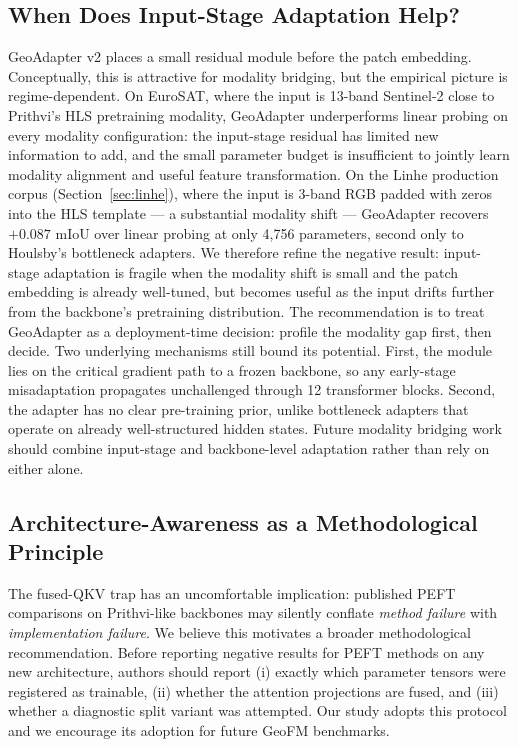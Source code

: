 \subsection{When Does Input-Stage Adaptation Help?}
GeoAdapter v2 places a small residual module before the patch embedding. Conceptually, this is attractive for modality bridging, but the empirical picture is regime-dependent. On EuroSAT, where the input is 13-band Sentinel-2 close to Prithvi's HLS pretraining modality, GeoAdapter underperforms linear probing on every modality configuration: the input-stage residual has limited new information to add, and the small parameter budget is insufficient to jointly learn modality alignment and useful feature transformation. On the Linhe production corpus (Section~\ref{sec:linhe}), where the input is 3-band RGB padded with zeros into the HLS template --- a substantial modality shift --- GeoAdapter recovers $+0.087$ mIoU over linear probing at only 4{,}756 parameters, second only to Houlsby's bottleneck adapters. We therefore refine the negative result: input-stage adaptation is fragile when the modality shift is small and the patch embedding is already well-tuned, but becomes useful as the input drifts further from the backbone's pretraining distribution. The recommendation is to treat GeoAdapter as a deployment-time decision: profile the modality gap first, then decide. Two underlying mechanisms still bound its potential. First, the module lies on the critical gradient path to a frozen backbone, so any early-stage misadaptation propagates unchallenged through 12 transformer blocks. Second, the adapter has no clear pre-training prior, unlike bottleneck adapters that operate on already well-structured hidden states. Future modality bridging work should combine input-stage and backbone-level adaptation rather than rely on either alone.

\subsection{Architecture-Awareness as a Methodological Principle}
The fused-QKV trap has an uncomfortable implication: published PEFT comparisons on Prithvi-like backbones may silently conflate \emph{method failure} with \emph{implementation failure}. We believe this motivates a broader methodological recommendation. Before reporting negative results for PEFT methods on any new architecture, authors should report (i) exactly which parameter tensors were registered as trainable, (ii) whether the attention projections are fused, and (iii) whether a diagnostic split variant was attempted. Our study adopts this protocol and we encourage its adoption for future GeoFM benchmarks.

